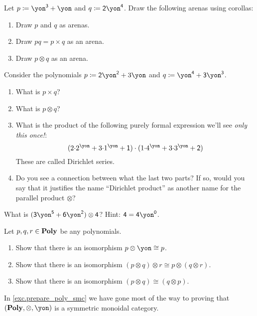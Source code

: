 \documentclass[Book-Poly]{subfiles}
\begin{document}
\begin{exercise}
Let $p\coloneqq\yon^\3+\yon$ and $q\coloneqq\2\yon^\4$. Draw the following
arenas using corollas:
\begin{enumerate}
	\item Draw $p$ and $q$ as arenas.
	\item Draw $pq=p\times q$ as an arena.
	\item Draw $p\otimes q$ as an arena.
\qedhere
\end{enumerate}
\end{exercise}

\begin{exercise}
Consider the polynomials $p\coloneqq \2\yon^\2+3\yon$ and $q\coloneqq\yon^\4+\3\yon^\3$.
\begin{enumerate}
	\item What is $p\times q$?
	\item What is $p\otimes q$?
	\item What is the product of the following purely formal expression we'll see \emph{only this once!}:
	\[
	(2\mdot2^\yon+3\mdot 1^\yon+\1) \cdot 
	(1\mdot4^\yon+3\mdot 3^\yon+\2)
	\]
These are called Dirichlet series.
	\item Do you see a connection between what the last two parts? If so, would
    you say that it justifies the name ``Dirichlet product'' as another name for
    the parallel product $\otimes$?
\end{enumerate}
\end{exercise}

\begin{exercise}
What is $(\3\yon^\5+\6\yon^\2)\otimes\4$? Hint: $\4=\4\yon^\0$.
\end{exercise}

\begin{exercise}\label{exc.prepare_poly_smc}
Let $p,q,r\in\textbf{Poly}$ be any polynomials.
\begin{enumerate}
  \item Show that there is an isomorphism $p\otimes\yon\cong p$.
  \item Show that there is an isomorphism $(p\otimes q)\otimes r\cong p\otimes (q\otimes r)$.
  \item Show that there is an isomorphism $(p\otimes q)\cong(q\otimes p)$.
 \qedhere
\end{enumerate}
\end{exercise}

In \cref{exc.prepare_poly_smc} we have gone most of the way to proving that $(\poly,\otimes,\yon)$ is a symmetric monoidal category. 
\end{document}

